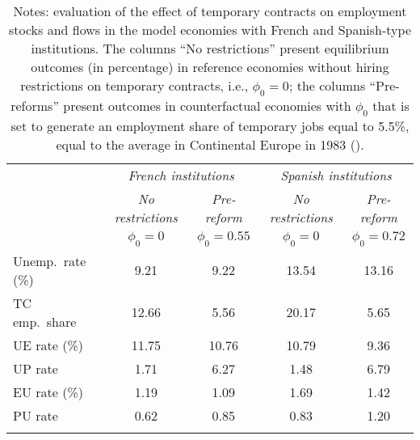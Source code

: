 \begin{table}[!h]
\centering
{}
\begin{tabular}{l c c c c}
\hline \hline
\addlinespace
 & \multicolumn{2}{c}{ \textit{French institutions} } & \multicolumn{2}{c}{ \textit{Spanish institutions} } \\
 & \textit{No restrictions}  & \textit{Pre-reform} &  \textit{No restrictions}  & \textit{Pre-reform} \\
 & $\phi_0=0$ & $\phi_0=0.55$ & $\phi_0=0$ & $\phi_0=0.72$ \\
 \addlinespace 
 Unemp.\ rate (\%)                                &9.21 & 9.22 & 13.54 & 13.16\\
 TC emp.\ share                              &12.66 & 5.56 & 20.17 & 5.65\\
 \addlinespace
UE rate (\%)           &11.75 & 10.76 & 10.79 & 9.36\\
UP rate                  &1.71 & 6.27 & 1.48 & 6.79\\
 \addlinespace
EU rate (\%)           &1.19 & 1.09 & 1.69 & 1.42\\
PU rate                  &0.62 & 0.85 & 0.83 & 1.20\\
\addlinespace
\hline \hline
\end{tabular}
\label{tab:effect_EPL}
\caption*{ \footnotesize Notes: evaluation of the effect of temporary contracts on employment stocks and flows in the model economies with French and Spanish-type institutions. The columns ``No restrictions'' present equilibrium outcomes (in percentage) in reference economies without hiring restrictions on temporary contracts, i.e., $\phi_0=0$; the columns ``Pre-reforms'' present outcomes in counterfactual economies with $\phi_0$ that is set to generate an employment share of temporary jobs equal to 5.5\%, equal to the average in Continental Europe in 1983 (\cite{faccini:2014:EJ}).}\end{table}